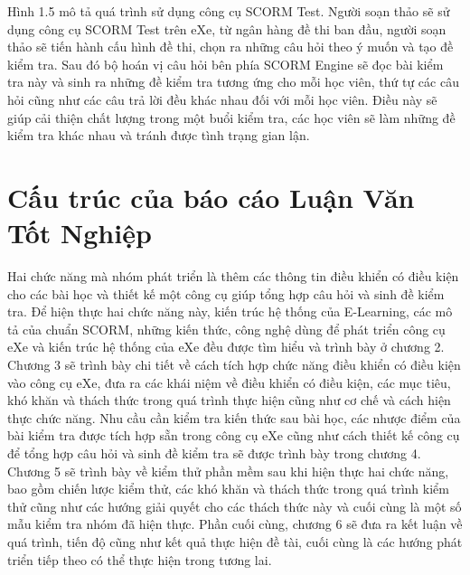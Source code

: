 	Hình 1.5 mô tả quá trình sử dụng công cụ SCORM Test. Người soạn thảo sẽ sử dụng công cụ SCORM Test trên eXe, từ ngân hàng đề thi ban đầu, người soạn thảo sẽ tiến hành cấu hình đề thi, chọn ra những câu hỏi theo ý muốn và tạo đề kiểm tra. Sau đó bộ hoán vị câu hỏi bên phía SCORM Engine sẽ đọc bài kiểm tra này và sinh ra những đề kiểm tra tương ứng cho mỗi học viên, thứ tự các câu hỏi cũng như các câu trả lời đều khác nhau đối với mỗi học viên. Điều này sẽ giúp cải thiện chất lượng trong một buổi kiểm tra, các học viên sẽ làm những đề kiểm tra khác nhau và tránh được tình trạng gian lận.

\section{Cấu trúc của báo cáo Luận Văn Tốt Nghiệp}

	Hai chức năng mà nhóm phát triển là thêm các thông tin điều khiển có điều kiện cho các bài học và thiết kế một công cụ giúp tổng hợp câu hỏi và sinh đề kiểm tra. Để hiện thực hai chức năng này, kiến trúc hệ thống của E-Learning, các mô tả của chuẩn SCORM, những kiến thức, công nghệ dùng để phát triển công cụ eXe và kiến trúc hệ thống của eXe đều được tìm hiểu và trình bày ở chương 2. Chương 3 sẽ trình bày chi tiết về cách tích hợp chức năng điều khiển có điều kiện vào công cụ eXe, đưa ra các khái niệm về điều khiển có điều kiện, các mục tiêu, khó khăn và thách thức trong quá trình thực hiện cũng như cơ chế và cách hiện thực chức năng. Nhu cầu cần kiểm tra kiến thức sau bài học, các nhược điểm của bài kiểm tra được tích hợp sẵn trong công cụ eXe cũng như cách thiết kế công cụ để tổng hợp câu hỏi và sinh đề kiểm tra sẽ được trình bày trong chương 4. Chương 5 sẽ trình bày về kiểm thử phần mềm sau khi hiện thực hai chức năng, bao gồm chiến lược kiểm thử, các khó khăn và thách thức trong quá trình kiểm thử cũng như các hướng giải quyết cho các thách thức này và cuối cùng là một số mẫu kiểm tra nhóm đã hiện thực. Phần cuối cùng, chương 6 sẽ đưa ra kết luận về quá trình, tiến độ cũng như kết quả thực hiện đề tài, cuối cùng là các hướng phát triển tiếp theo có thể thực hiện trong tương lai.



